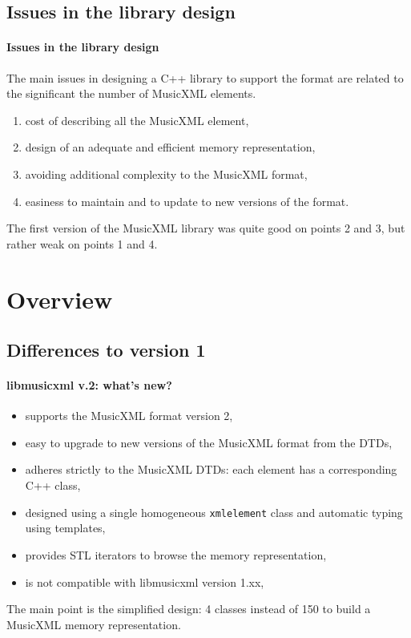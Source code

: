\documentclass{beamer}
\begin{document}
\section{Issues in the library design}
\begin{frame}
  \frametitle{Issues in the library design}
  The main issues in designing a C++ library to support the format are related to the significant
  the number of MusicXML elements.
  \begin{enumerate}
    \item cost of describing all the MusicXML element,
    \item design of an adequate and efficient memory representation,
    \item avoiding additional complexity to the MusicXML format,
    \item easiness to maintain and to update to new versions of the format.
  \end{enumerate}

  \begin{block}{}
  The first version of the MusicXML library was quite good on points 2 and 3, but rather weak
  on points 1 and 4.
  \end{block}
\end{frame}


\chapter{Overview}
\section{Differences to version 1}
\begin{frame}
  \frametitle{libmusicxml v.2: what's new?}
  
\begin{itemize}
    \item supports the MusicXML format version 2,
    \item easy to upgrade to new versions of the MusicXML format from the DTDs,
    \item adheres strictly to the MusicXML DTDs: each element has a corresponding C++ class,
    \item designed using a single homogeneous \texttt{xmlelement} class and automatic
    typing using templates,
    \item provides STL iterators to browse the memory representation,
    \item is \alert{not compatible} with libmusicxml version 1.xx,
  \end{itemize}
  \begin{block}{}
  The main point is the simplified design: 4 classes instead of 150 to build a MusicXML
  memory representation.
  \end{block}
\end{frame}
\end{document}

